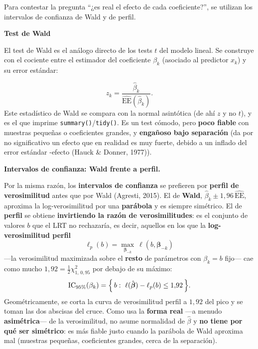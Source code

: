 \documentclass[
  letterpaper,
  DIV=11,
  numbers=noendperiod]{scrartcl}
\begin{document}
Para contestar la pregunta ``¿es real el efecto de cada coeficiente?'',
se utilizan los intervalos de confianza de Wald y de perfil.

\textbf{Test de Wald}

El test de Wald es el análogo directo de los tests \(t\) del modelo
lineal. Se construye con el cociente entre el estimador del coeficiente
\(\beta_k\) (asociado al predictor \(x_k\)) y su error estándar:

\[
z_k=\frac{\hat\beta_k}{\widehat{\text{EE}}(\hat\beta_k)}.
\] Este estadístico de Wald se compara con la normal asintótica (de ahí
\(z\) y no \(t\)), y es el que imprime
\texttt{summary()}/\texttt{tidy()}. Es un test cómodo, pero \textbf{poco
fiable} con muestras pequeñas o coeficientes grandes, y \textbf{engañoso
bajo separación} (da por no significativo un efecto que en realidad es
muy fuerte, debido a un inflado del error estándar -efecto (Hauck \&
Donner, 1977)).

\textbf{Intervalos de confianza: Wald frente a perfil.}

Por la misma razón, los \textbf{intervalos de confianza} se prefieren
por \textbf{perfil de verosimilitud} antes que por Wald (Agresti, 2015).
El de \textbf{Wald}, \(\hat\beta_k\pm1{,}96\,\widehat{\text{EE}}\),
aproxima la log-verosimilitud por una \textbf{parábola} y es siempre
simétrico. El de \textbf{perfil} se obtiene \textbf{invirtiendo la razón
de verosimilitudes}: es el conjunto de valores \(b\) que el LRT no
rechazaría, es decir, aquellos en los que la \textbf{log-verosimilitud
perfil} \[
\ell_p(b)=\max_{\boldsymbol\beta_{-k}}\ \ell(b,\boldsymbol\beta_{-k})
\] ---la verosimilitud maximizada sobre el \textbf{resto} de parámetros
con \(\beta_k=b\) fijo--- cae como mucho
\(1{,}92=\tfrac12\chi^2_{1,\,0{,}95}\) por debajo de su máximo: \[
\text{IC}_{95\%}(\beta_k)=\Bigl\{\,b:\ \ell(\hat{\boldsymbol\beta})-\ell_p(b)\le 1{,}92\,\Bigr\}.
\] Geométricamente, se corta la curva de verosimilitud perfil a
\(1{,}92\) del pico y se toman las dos abscisas del cruce. Como usa la
\textbf{forma real} ---a menudo \textbf{asimétrica}--- de la
verosimilitud, no asume normalidad de \(\hat\beta\) y \textbf{no tiene
por qué ser simétrico}: es más fiable justo cuando la parábola de Wald
aproxima mal (muestras pequeñas, coeficientes grandes, cerca de la
separación).
\end{document}
